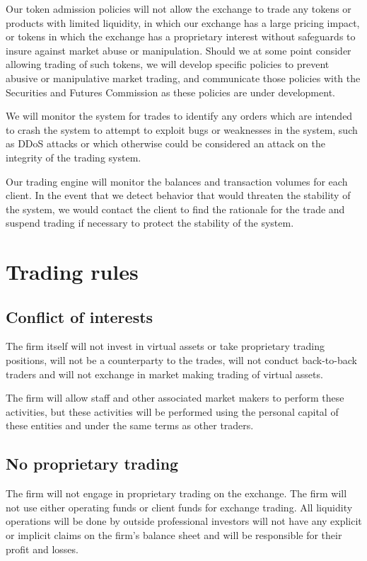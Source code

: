 Our token admission policies will not allow the exchange to trade any
tokens or products with limited liquidity, in which our exchange has a
large pricing impact, or tokens in which the exchange has a
proprietary interest without safeguards to insure against market abuse
or manipulation.  Should we at some point consider allowing trading of
such tokens, we will develop specific policies to prevent abusive or
manipulative market trading, and communicate those policies with the
Securities and Futures Commission as these policies are under
development.

We will monitor the system for trades to identify any orders which are
intended to crash the system to attempt to exploit bugs or weaknesses
in the system, such as DDoS attacks or which otherwise could be considered an
attack on the integrity of the trading system.

Our trading engine will monitor the balances and transaction volumes
for each client.  In the event that we detect behavior that would
threaten the stability of the system, we would contact the client to
find the rationale for the trade and suspend trading if necessary to
protect the stability of the system.

\section{Trading rules}

\subsection{Conflict of interests}
The firm itself will not invest in virtual assets or take proprietary
trading positions, will not be a counterparty to the trades, will not
conduct back-to-back traders and will not exchange in market making
trading of virtual assets.

The firm will allow staff and other associated market makers to
perform these activities, but these activities will be performed using
the personal capital of these entities and under the same terms as
other traders.

\subsection{No proprietary trading}

The firm will not engage in proprietary trading on the exchange.  The firm will not use either operating funds or client funds for exchange
trading.  All liquidity operations will be done by outside
professional investors will not have any explicit or implicit claims
on the firm's balance sheet and will be responsible for their
profit and losses.

